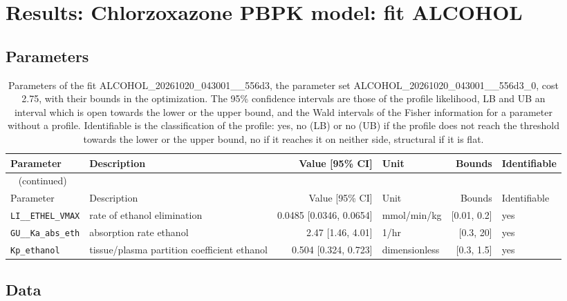 \documentclass{article}
\begin{document}
\section{Results: Chlorzoxazone PBPK model: fit ALCOHOL}

\subsection{Parameters}

\begin{longtable}{llrlrl}
\caption{Parameters of the fit ALCOHOL\_20261020\_043001\_\_556d3, the parameter set ALCOHOL\_20261020\_043001\_\_556d3\_0, cost 2.75, with their bounds in the optimization. The 95\% confidence intervals are those of the profile likelihood, LB and UB an interval which is open towards the lower or the upper bound, and the Wald intervals of the Fisher information for a parameter without a profile. Identifiable is the classification of the profile: yes, no (LB) or no (UB) if the profile does not reach the threshold towards the lower or the upper bound, no if it reaches it on neither side, structural if it is flat.}\label{tab:parameters:ALCOHOL_20261020_043001__556d3} \\
\toprule
Parameter & Description & Value [95\% CI] & Unit & Bounds & Identifiable \\
\midrule
\endfirsthead
\multicolumn{6}{l}{\small\tablename~\thetable{} (continued)} \\
\toprule
Parameter & Description & Value [95\% CI] & Unit & Bounds & Identifiable \\
\midrule
\endhead
\bottomrule
\endlastfoot
\texttt{LI\_\_ETHEL\_VMAX} & rate of ethanol elimination & 0.0485 [0.0346, 0.0654] & mmol/min/kg & [0.01, 0.2] & yes \\
\texttt{GU\_\_Ka\_abs\_eth} & absorption rate ethanol & 2.47 [1.46, 4.01] & 1/hr & [0.3, 20] & yes \\
\texttt{Kp\_ethanol} & tissue/plasma partition coefficient ethanol & 0.504 [0.324, 0.723] & dimensionless & [0.3, 1.5] & yes \\
\end{longtable}

\subsection{Data}
\end{document}

